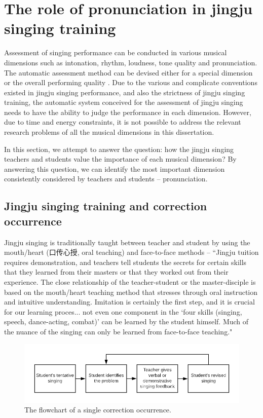 \section{The role of pronunciation in jingju singing training}\label{sec:probdef:role_pronunciation}

Assessment of singing performance can be conducted in various musical dimensions such as intonation, rhythm, loudness, tone quality and pronunciation. The automatic assessment method can be devised either for a special dimension or the overall performing quality \cite{Guptab}. Due to the various and complicate conventions existed in jingju singing performance, and also the strictness of jingju singing training, the automatic system conceived for the assessment of jingju singing needs to have the ability to judge the performance in each dimension. However, due to time and energy constraints, it is not possible to address the relevant research problems of all the musical dimensions in this dissertation. 

In this section, we attempt to answer the question: how the jingju singing teachers and students value the importance of each musical dimension? By answering this question, we can identify the most important dimension consistently considered by teachers and students -- pronunciation.

\subsection{Jingju singing training and correction occurrence}\label{sec:probdef:correction_occurance}

Jingju singing is traditionally taught between teacher and student by using the mouth/heart (口传心授, oral teaching) and face-to-face methods -- ``Jingju tuition requires demonstration, and teachers tell students the secrets for certain skills that they learned from their masters or that they worked out from their experience. The close relationship of the teacher-student or the master-disciple is based on the mouth/heart teaching method that stresses through oral instruction and intuitive understanding. Imitation is certainly the first step, and it is crucial for our learning proces... not even one component in the `four skills (singing, speech, dance-acting, combat)' can be learned by the student himself. Much of the nuance of the singing can only be learned from face-to-face teaching." \cite{Li2010a}

\begin{figure}[ht!]
\includegraphics[width=\textwidth]{figs/blockDiags_rong/ch3_occurrance_flow.png}
\caption{The flowchart of a single correction occurrence.}
\label{fig:ch3_occurrance_flow}
\end{figure}

